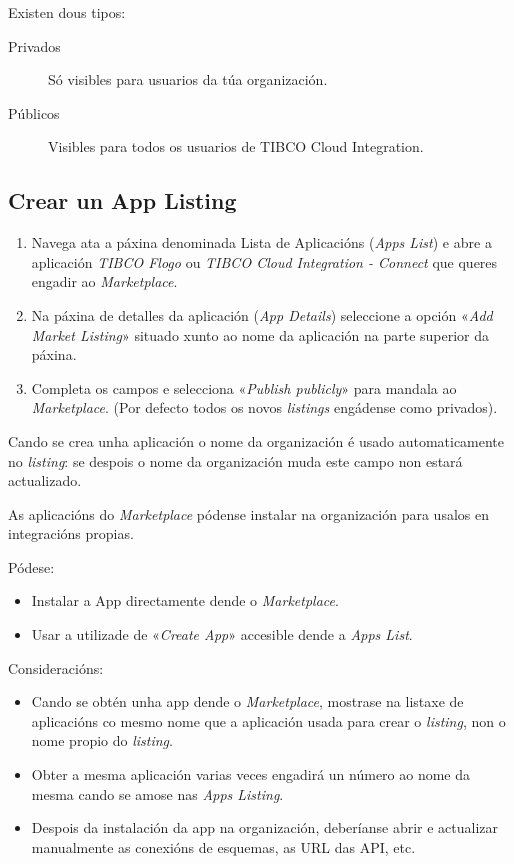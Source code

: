 Existen dous tipos:

\begin{description}
    \item[Privados] Só visibles para usuarios da túa organización.
    \item[Públicos] Visibles para todos os usuarios de TIBCO Cloud Integration.
\end{description}

\subsection{Crear un App Listing}

\begin{enumerate}
	\item Navega ata a páxina denominada Lista de Aplicacións (\textit{Apps List}) e abre a aplicación  \textit{TIBCO Flogo} ou \textit{TIBCO Cloud Integration - Connect} que queres engadir ao \textit{Marketplace}.
	
	\item Na páxina de detalles da aplicación (\textit{App Details}) seleccione a opción «\textit{Add Market Listing}» situado xunto ao nome da aplicación na parte superior da páxina.
	
	\item Completa os campos e selecciona «\textit{Publish publicly}» para mandala ao \textit{Marketplace}. (Por defecto todos os novos \textit{listings} engádense como privados).
\end{enumerate}

Cando se crea unha aplicación o nome da organización é usado automaticamente no \textit{listing}: se despois o nome da organización muda este campo non estará actualizado.

As aplicacións do \textit{Marketplace} pódense instalar na organización para usalos en integracións propias.

Pódese:

\begin{itemize}
    \item Instalar a App directamente dende o \textit{Marketplace}.
    \item Usar a utilizade de «\textit{Create App}» accesible dende a \textit{Apps List}.
\end{itemize}

Consideracións:

\begin{itemize}
    \item Cando se obtén unha app dende o \textit{Marketplace}, mostrase na listaxe de aplicacións co mesmo nome que a aplicación usada para crear o \textit{listing}, non o nome propio do \textit{listing}.
    
    \item Obter a mesma aplicación varias veces engadirá un número ao nome da mesma cando  se amose nas \textit{Apps Listing}.
    
    \item Despois da instalación da app na organización, deberíanse abrir e actualizar manualmente as conexións de esquemas, as URL das API, etc.
\end{itemize}

